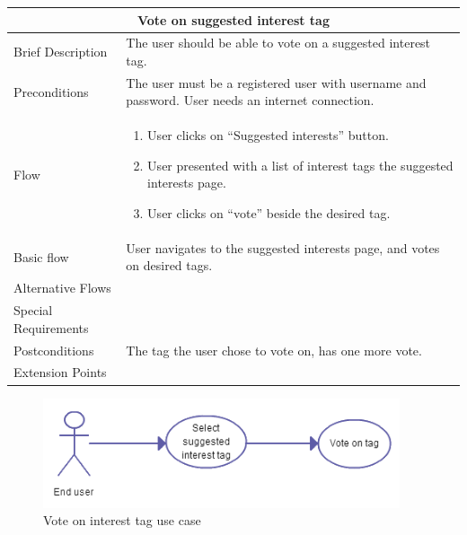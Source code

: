 \begin{minipage}{\linewidth}
\begin{tabular}{|l|p{85mm}|}
  \hline
  \multicolumn{2}{|c|}{\cellcolor{gray!25} \textbf{Vote on suggested interest tag}} \\
  \hline
  Brief Description & The user should be able to vote on a suggested interest tag.\\
  Preconditions & The user must be a registered user with username and password. User needs an internet connection.\\
  Flow &
    \begin{enumerate}
      \item User clicks on “Suggested interests” button.
      \item User presented with a list of interest tags the suggested interests page.
      \item User clicks on “vote” beside the desired tag.
    \end{enumerate} \\
  Basic flow & User navigates to the suggested interests page, and votes on desired tags.\\
  Alternative Flows & \\
  Special Requirements & \\
  Postconditions & The tag the user chose to vote on, has one more vote.\\
  Extension Points & \\
  \hline
\end{tabular}
\end{minipage}

\begin{figure}[ht!]
\centering
\includegraphics[width=105mm]{./SystemRequirements/img/votetagUC.png}
\caption{Vote on interest tag use case \label{fig:SysReqUseCasesVoteTag}}
\end{figure}